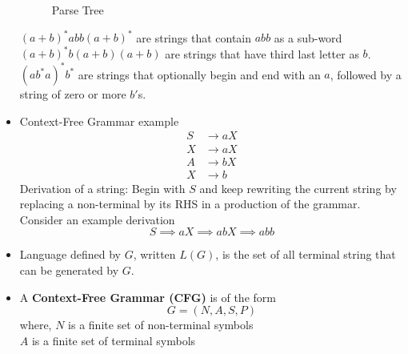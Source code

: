 \documentclass[a4paper]{article}
\begin{document}
\begin{itemize}
\begin{figure}[H]
        \caption{Parse Tree}
    \end{figure}
    $(a+b)^*abb(a+b)^*$ are strings that contain $abb$ as a sub-word\\
    $(a+b)^*b(a+b)(a+b)$ are strings that have third last letter as $b$.\\
    $(ab^*a)^*b^*$ are strings that optionally begin and end with an $a$, followed by a string of zero or more $b'$s.
    \item Context-Free Grammar example
    \begin{equation*}
        \begin{split}
            S&\to aX\\
            X&\to aX\\
            A&\to bX\\
            X&\to b
        \end{split}
    \end{equation*}
    Derivation of a string: Begin with $S$ and keep rewriting the current string by replacing a non-terminal by its RHS in a production of the grammar.\\
    Consider an example derivation
    \begin{equation*}
        S\implies aX\implies abX\implies abb
    \end{equation*}
    \item Language defined by $G$, written $L(G)$, is the set of all terminal string that can be generated by $G$.
    \item A \textbf{Context-Free Grammar (CFG)} is of the form
    \begin{equation*}
        G=(N,A,S,P)
    \end{equation*}
    where, $N$ is a finite set of non-terminal symbols\\
    $A$ is a finite set of terminal symbols\\

\end{itemize}
\end{document}
